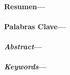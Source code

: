 \newpage
\setcounter{page}{2}
\
\vfill
\vfill
\begin{flushright}
\end{flushright}
\begin{flushright}
\noindent 
\dedicatoria
\end{flushright}
\vfill
\newpage
\begin{center}
\end{center}
\noindent 
\agradecimientos
\vfill
\newpage
{}
\vspace{0.3cm}
\noindent \textbf{Resumen---}
\resumen 
\ \\
\vspace{0.3cm} \\
\noindent \textbf{Palabras Clave---}
\palabrasclave 
\ \\
\vspace{1.2cm} \\
\vspace{0.3cm}
\noindent \textbf{\emph{Abstract}---}
\resumeningles 
\ \\
\vspace{0.3cm} \\
\noindent \textbf{\emph{Keywords}---}
\palabrasclaveingles
\ \\
